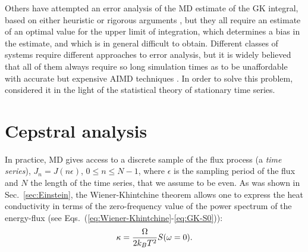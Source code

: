 \begin{LEtext}
Others have attempted an error analysis of the MD estimate of the GK integral, based on either heuristic or rigorous arguments \citep{Jones2012,Wang_gk2017,Oliveira2017}, but they all require an estimate of an optimal value for the upper limit of integration, which determines a bias in the estimate, and which is in general difficult to obtain. Different classes of systems require different approaches to error analysis, but it is widely believed that all of them always require so long simulation times as to be unaffordable with accurate but expensive AIMD techniques \citep{Carbogno:2017gc}. In order to solve this problem, \cite{Ercole2017} considered it in the light of the statistical theory of stationary time series.

\end{LEtext}


\section{Cepstral analysis}  \label{sec:cepstral-analysis}

In practice, MD gives access to a discrete sample of the flux process (a \emph{time series}), $J_n = J(n \epsilon)$, $0 \leq n \leq N-1$, where $\epsilon$ is the sampling period of the flux and $N$ the length of the time series, that we assume to be even. As was shown in Sec.~\ref{sec:Einstein}, the Wiener-Khintchine theorem allows one to express the heat conductivity in terms of the zero-frequency value of the power spectrum of the energy-flux (see Eqs.~(\ref{eq:Wiener-Khintchine}-\ref{eq:GK-S0})):
\begin{equation}
\kappa = \frac{\rOmega}{2k_B T^2} S (\omega=0). \label{eq:kappa-S0}
\end{equation}


